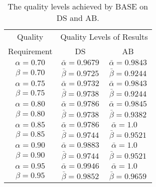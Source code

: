 \begin{table}
\vspace{-0.2cm}
\caption{The quality levels achieved by BASE on DS and AB.}
\vspace{-0.1cm}
\centering
\label{tab:con-quality}
\begin{tabular}{|c|c|c|}
\hline
Quality & \multicolumn{2}{c|}{Quality Levels of Results} \\
\cline{2-3}
Requirement & DS & AB \\
\hline
$\alpha=0.70$ & $\bar{\alpha}=0.9679$ & $\bar{\alpha}=0.9843$ \\
$\beta=0.70$ & $\bar{\beta}=0.9725$ & $\bar{\beta}=0.9244$ \\
\hline
$\alpha=0.75$ & $\bar{\alpha}=0.9732$ & $\bar{\alpha}=0.9843$ \\
$\beta=0.75$ & $\bar{\beta}=0.9738$ & $\bar{\beta}=0.9244$ \\
\hline
$\alpha=0.80$ & $\bar{\alpha}=0.9786$ & $\bar{\alpha}=0.9845$ \\
$\beta=0.80$ & $\bar{\beta}=0.9738$ & $\bar{\beta}=0.9382$ \\
\hline
$\alpha=0.85$ & $\bar{\alpha}=0.9786$ & $\bar{\alpha}=1.0\ \ \ \ $ \\
$\beta=0.85$ & $\bar{\beta}=0.9744$ & $\bar{\beta}=0.9521$ \\
\hline
$\alpha=0.90$ & $\bar{\alpha}=0.9883$ & $\bar{\alpha}=1.0\ \ \ \ $ \\
$\beta=0.90$ & $\bar{\beta}=0.9744$ & $\bar{\beta}=0.9521$ \\
\hline
$\alpha=0.95$ & $\bar{\alpha}=0.9946$ & $\bar{\alpha}=1.0\ \ \ \ $ \\
$\beta=0.95$ & $\bar{\beta}=0.9852$ & $\bar{\beta}=0.9659$ \\
\hline
\end{tabular}
\vspace{-0.5cm}
\end{table}

